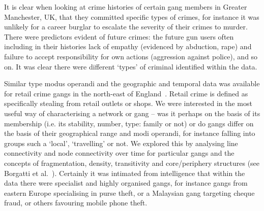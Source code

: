 \documentclass{llncs}
\begin{document}
It is clear when looking at crime histories of certain gang members in
Greater Manchester, UK, that they committed specific types of crimes,
for instance it was unlikely for a career burglar to escalate the
severity of their crimes to murder. There were predictors evident of
future crimes: the future gun users often including in their histories
lack of empathy (evidenced by abduction, rape) and failure to accept
responsibility for own actions (aggression against police), and so
on. It was clear there were different `types' of criminal identified
within the data.



Similar type modus operandi and the geographic and temporal data was
available for retail crime gangs in the north-east of
England~\cite{ewart+oatley:2009}. Retail crime is defined as
specifically stealing from retail outlets or shops. We were interested
in the most useful way of characterising a network or gang -- was it
perhaps on the basis of its membership (i.e. its stability, number,
type: family or not) or do gangs differ on the basis of their
geographical range and modi operandi, for instance falling into groups
such a `local', `travelling' or not.  We explored this by analysing
line connectivity and node connectivity over time for particular gangs
and the concepts of fragmentation, density, transitivity and
core/periphery structures (see Borgatti et
al.~\cite{borgatti-et-al:2009}).  Certainly it was intimated from
intelligence that within the data there were specialist and highly
organised gangs, for instance gangs from eastern Europe specialising
in purse theft, or a Malaysian gang targeting cheque fraud, or others
favouring mobile phone theft.
\end{document}
